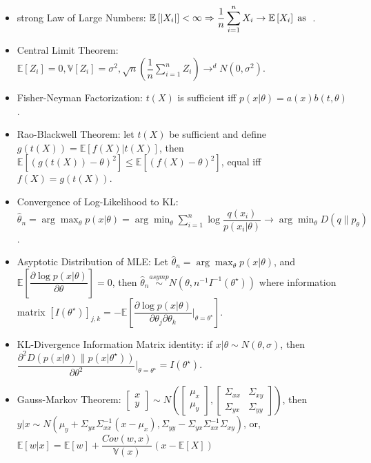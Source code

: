 \documentclass{article}
\begin{document}
\begin{itemize}
\item strong Law of Large Numbers: $\mathbb{E}\left[| X_{i} |\right] < \infty \Rightarrow  \dfrac{1}{n} \displaystyle\sum_{i=1}^{n} X_{i} \to  \mathbb{E}\left[X_{i}\right] \text{\;as\;}$ .
\item Central Limit Theorem: $\mathbb{E}\left[Z_{i}\right] = 0, \mathbb{V}\left[Z_{i}\right] = \sigma^{2}, \sqrt{n} \left( \dfrac{1}{n} \displaystyle\sum_{i=1}^{n} Z_{i} \right) \to ^{d} N\left(0, \sigma^{2}\right)$.
\item Fisher-Neyman Factorization: $t\left(X\right) $ is sufficient iff $p\left(x | \theta\right)  = a\left(x\right) b\left(t, \theta\right)$.
\item Rao-Blackwell Theorem: let $t\left(X\right) $ be sufficient and define $g\left(t\left(X\right)\right)  = \mathbb{E}\left[f\left(X\right) | t\left(X\right)\right]$, then $\mathbb{E}\left[\left(g\left(t\left(X\right)\right) - \theta\right)^{2}\right] \leq  \mathbb{E}\left[\left(f\left(X\right) - \theta\right)^{2}\right]$, equal iff $f\left(X\right)  = g\left(t\left(X\right)\right) $.
\item Convergence of Log-Likelihood to KL: $\hat{\theta}_{n} = \arg\displaystyle\max_{\theta} p\left(x | \theta\right) = \arg\displaystyle\min_{\theta} \displaystyle\sum_{i=1}^{n} \log \dfrac{q\left(x_{i}\right)}{p\left(x_{i} | \theta\right)} \to  \arg\displaystyle\min_{\theta} D\left(q \| p_{\theta}\right)$.
\item Asyptotic Distribution of MLE: Let $\hat{\theta}_{n} = \arg\displaystyle\max_{\theta} p\left(x | \theta\right)$, and $\mathbb{E}\left[\dfrac{\partial \log p\left(x | \theta\right)}{\partial \theta}\right] = 0$, then $\hat{\theta}_{n} \stackrel{asymp}{\sim} N\left(\theta, n^{-1} I^{-1}\left(\theta^\star \right)\right)$ where information matrix $\left[I\left(\theta^\star \right)\right]_{j,k} = - \mathbb{E}\left[\dfrac{\partial \log p\left(x | \theta\right)}{\partial \theta_{j} \partial \theta_{k}} \bigg|_{\theta = \theta^\star }\right]$.
\item KL-Divergence Information Matrix identity: if $x  | \theta \sim  N\left(\theta, \sigma\right)$, then $\dfrac{\partial^2 D \left(p\left(x | \theta\right) \| p\left(x | \theta^\star \right)\right)}{\partial \theta^2} \bigg|_{\theta = \theta^\star } = I\left(\theta^\star \right)$.
\item Gauss-Markov Theorem: $\begin{bmatrix} x \\ y \end{bmatrix} \sim  N\left(\begin{bmatrix} \mu_{x} \\ \mu_{y} \end{bmatrix} , \begin{bmatrix} \Sigma_{x x} & \Sigma_{xy} \\ \Sigma_{yx} & \Sigma_{yy} \end{bmatrix} \right)$, then $y  | x \sim  N\left(\mu_{y} + \Sigma_{yx} \Sigma_{x x}^{-1} \left(x - \mu_{x}\right), \Sigma_{yy} - \Sigma_{yx} \Sigma_{x x}^{-1} \Sigma_{xy}\right)$, or, $\mathbb{E}\left[w | x\right] = \mathbb{E}\left[w\right] + \dfrac{Cov\left(w, x\right)}{\mathbb{V}\left(x\right)} \left(x - \mathbb{E}\left[X\right]\right)$

\end{itemize}
\end{document}
